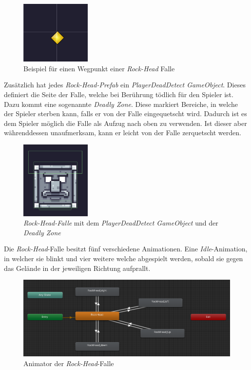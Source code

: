 \begin{figure}[th]
\centering
\includegraphics[width=35mm]{Figures/rock_head_waypoint.png}
\decoRule
\caption[Rock-Head-Falle Wegpunkt]{Beispiel für einen Wegpunkt einer \textit{Rock-Head} Falle}
\label{fig:rock-head-waypoint}
\end{figure}

Zusätzlich hat jedes \textit{Rock-Head-Prefab} ein \textit{PlayerDeadDetect GameObject}. Dieses definiert die Seite der Falle, welche bei Berührung tödlich für den Spieler ist. Dazu kommt eine sogenannte \textit{Deadly Zone}. Diese markiert Bereiche, in welche der Spieler sterben kann, falls er von der Falle eingequetscht wird. Dadurch ist es dem Spieler möglich die Falle als Aufzug nach oben zu verwenden. Ist dieser aber währenddessen unaufmerksam, kann er leicht von der Falle zerquetscht werden.\\

\begin{figure}[th]
\centering
\includegraphics[width=35mm]{Figures/rock_head_colli.png}
\decoRule
\caption[Rock-Head-Falle Colliders]{\textit{Rock-Head-Falle} mit dem \textit{PlayerDeadDetect GameObject} und der \textit{Deadly Zone}}
\label{fig:rock-head-collision}
\end{figure}

Die \textit{Rock-Head}-Falle besitzt fünf verschiedene Animationen. Eine \textit{Idle}-Animation, in welcher sie blinkt und vier weitere welche abgespielt werden, sobald sie gegen das Gelände in der jeweiligen Richtung aufprallt.\\

\begin{figure}[th]
\centering
\includegraphics[width=150mm]{Figures/rock_head_animator.png}
\decoRule
\caption[Rock Head Animator]{Animator der \textit{Rock-Head}-Falle}
\label{fig:rock-head-animator}
\end{figure}

